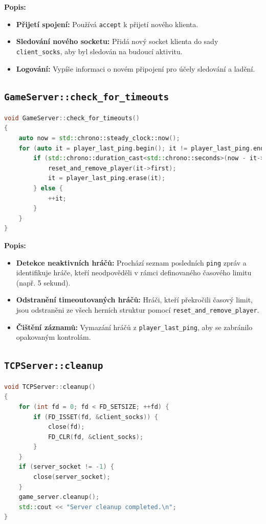 \documentclass[12pt, a4paper]{article}
\begin{document}
\noindent
\textbf{Popis:}
\begin{itemize}
    \item \textbf{Přijetí spojení:} Používá \texttt{accept} k přijetí nového klienta.
    \item \textbf{Sledování nového socketu:} Přidá nový socket klienta do sady \texttt{client\_socks}, aby byl sledován na budoucí aktivitu.
    \item \textbf{Logování:} Vypíše informaci o novém připojení pro účely sledování a ladění.
\end{itemize}
\newpage
\subsection{\texttt{GameServer::check\_for\_timeouts}}
\begin{lstlisting}[language=C++, caption={Kontrola timeoutů hráčů}]
void GameServer::check_for_timeouts()
{
    auto now = std::chrono::steady_clock::now();
    for (auto it = player_last_ping.begin(); it != player_last_ping.end(); ) {
        if (std::chrono::duration_cast<std::chrono::seconds>(now - it->second).count() > 5) {
            reset_and_remove_player(it->first);
            it = player_last_ping.erase(it);
        } else {
            ++it;
        }
    }
}
\end{lstlisting}

\noindent
\textbf{Popis:}
\begin{itemize}
    \item \textbf{Detekce neaktivních hráčů:} Prochází seznam posledních \texttt{ping} zpráv a identifikuje hráče, kteří neodpověděli v rámci definovaného časového limitu (např. 5 sekund).
    \item \textbf{Odstranění timeoutovaných hráčů:} Hráči, kteří překročili časový limit, jsou odstraněni ze všech herních struktur pomocí \texttt{reset\_and\_remove\_player}.
    \item \textbf{Čištění záznamů:} Vymazání hráčů z \texttt{player\_last\_ping}, aby se zabránilo opakovaným kontrolám.
\end{itemize}
\newpage
\subsection{\texttt{TCPServer::cleanup}}
\begin{lstlisting}[language=C++, caption={Čištění serverových zdrojů}]
void TCPServer::cleanup()
{
    for (int fd = 0; fd < FD_SETSIZE; ++fd) {
        if (FD_ISSET(fd, &client_socks)) {
            close(fd);
            FD_CLR(fd, &client_socks);
        }
    }
    if (server_socket != -1) {
        close(server_socket);
    }
    game_server.cleanup();
    std::cout << "Server cleanup completed.\n";
}
\end{lstlisting}
\end{document}
